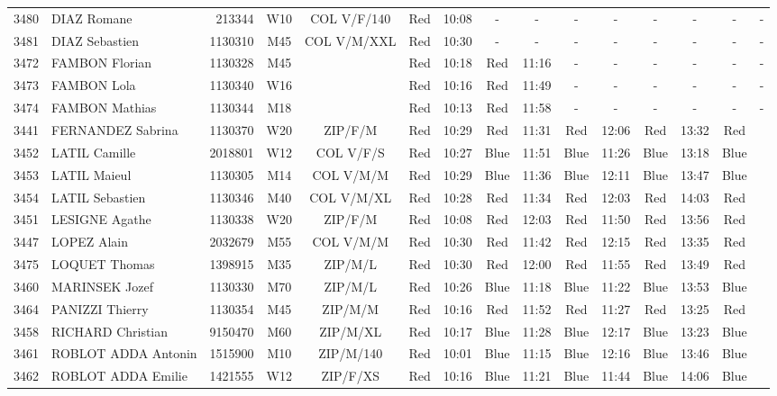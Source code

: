 \documentclass{report}
\begin{document}
\begin{longtable}{|c|l|r|c|c|*{5}{cc|}}
    3480 & DIAZ Romane & 213344 & W10 & COL V/F/140 & Red & 10:08 & - &  - & - &  - & - &  - & - &  -\\
    3481 & DIAZ Sebastien & 1130310 & M45 & COL V/M/XXL & Red & 10:30 & - &  - & - &  - & - &  - & - &  -\\
    3472 & FAMBON Florian & 1130328 & M45 &   & Red & 10:18 & Red & 11:16 & - &  - & - &  - & - &  -\\
    3473 & FAMBON Lola & 1130340 & W16 &   & Red & 10:16 & Red & 11:49 & - &  - & - &  - & - &  -\\
    3474 & FAMBON Mathias & 1130344 & M18 &   & Red & 10:13 & Red & 11:58 & - &  - & - &  - & - &  -\\
    3441 & FERNANDEZ Sabrina & 1130370 & W20 & ZIP/F/M & Red & 10:29 & Red & 11:31 & Red & 12:06 & Red & 13:32 & Red &  \\
    3452 & LATIL Camille & 2018801 & W12 & COL V/F/S & Red & 10:27 & Blue & 11:51 & Blue & 11:26 & Blue & 13:18 & Blue &  \\
    3453 & LATIL Maieul & 1130305 & M14 & COL V/M/M & Red & 10:29 & Blue & 11:36 & Blue & 12:11 & Blue & 13:47 & Blue &  \\
    3454 & LATIL Sebastien & 1130346 & M40 & COL V/M/XL & Red & 10:28 & Red & 11:34 & Red & 12:03 & Red & 14:03 & Red &  \\
    3451 & LESIGNE Agathe & 1130338 & W20 & ZIP/F/M & Red & 10:08 & Red & 12:03 & Red & 11:50 & Red & 13:56 & Red &  \\
    3447 & LOPEZ Alain & 2032679 & M55 & COL V/M/M & Red & 10:30 & Red & 11:42 & Red & 12:15 & Red & 13:35 & Red &  \\
    3475 & LOQUET Thomas & 1398915 & M35 & ZIP/M/L & Red & 10:30 & Red & 12:00 & Red & 11:55 & Red & 13:49 & Red &  \\
    3460 & MARINSEK Jozef & 1130330 & M70 & ZIP/M/L & Red & 10:26 & Blue & 11:18 & Blue & 11:22 & Blue & 13:53 & Blue &  \\
    3464 & PANIZZI Thierry & 1130354 & M45 & ZIP/M/M & Red & 10:16 & Red & 11:52 & Red & 11:27 & Red & 13:25 & Red &  \\
    3458 & RICHARD Christian & 9150470 & M60 & ZIP/M/XL & Red & 10:17 & Blue & 11:28 & Blue & 12:17 & Blue & 13:23 & Blue &  \\
    3461 & ROBLOT ADDA Antonin & 1515900 & M10 & ZIP/M/140 & Red & 10:01 & Blue & 11:15 & Blue & 12:16 & Blue & 13:46 & Blue &  \\
    3462 & ROBLOT ADDA Emilie & 1421555 & W12 & ZIP/F/XS & Red & 10:16 & Blue & 11:21 & Blue & 11:44 & Blue & 14:06 & Blue &  \\

\end{longtable}
\end{document}
